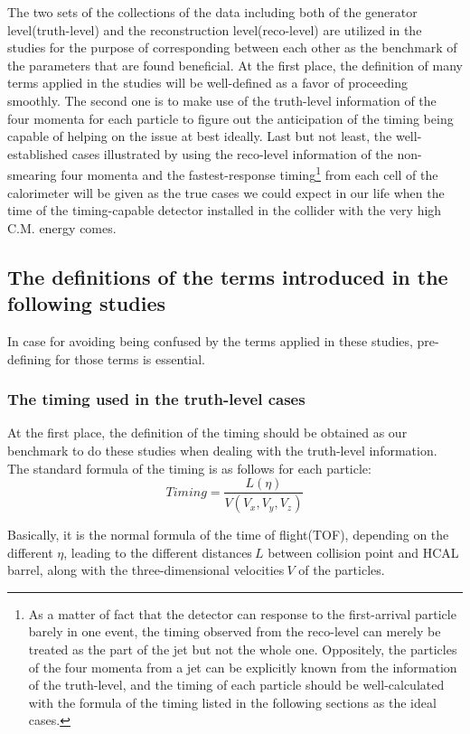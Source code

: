 The two sets of the collections of the data including both of the generator level(truth-level) and the reconstruction level(reco-level) are utilized in the studies for the purpose of corresponding between each other as the benchmark of the parameters that are found beneficial. At the first place, the definition of many terms applied in the studies will be well-defined as a favor of proceeding smoothly. The second one is to make use of the truth-level information of the four momenta for each particle to figure out the anticipation of the timing being capable of helping on the issue at best ideally. Last but not least, the well-established cases illustrated by using the reco-level information of the non-smearing four momenta and the fastest-response timing\footnote{As a matter of fact that the detector can response to the first-arrival particle barely in one event, the timing observed from the reco-level can merely be treated as the part of the jet but not the whole one. Oppositely, the particles of the four momenta from a jet can be explicitly known from the information of the truth-level, and the timing of each particle should be well-calculated with the formula of the timing listed in the following sections as the ideal cases.} from each cell of the calorimeter will be given as the true cases we could expect in our life when the time of the timing-capable detector installed in the collider with the very high C.M. energy comes.\\

\subsection{The definitions of the terms introduced in the following studies}
\label{sec:Def_timing}
In case for avoiding being confused by the terms applied in these studies, pre-defining for those terms is essential.\\
\subsubsection{The timing used in the truth-level cases}
At the first place, the definition of the timing should be obtained as our benchmark to do these studies when dealing with the truth-level information. The standard formula of the timing is as follows for each particle:
\begin{equation}
 Timing = \frac{L(\eta)}{V(V_{x},V_{y},V_{z})}  
\end{equation}

Basically, it is the normal formula of the time of flight(TOF), depending on the different \(\eta\), leading to the different distances\(\ L\) between collision point and HCAL barrel, along with the three-dimensional velocities\(\ V \) of the particles.\\


